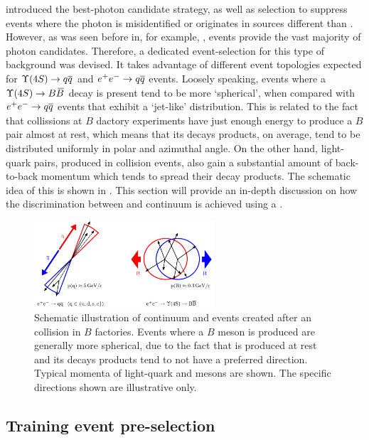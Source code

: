  introduced the best-photon candidate strategy, 
as well as selection to suppress events 
where the photon is misidentified or originates in sources different than \BtoXsgamma.
However, as was seen before in, for example, ,
\epem\ra\qqbar events provide the vast majority of photon candidates.
Therefore, a dedicated event-selection for this type of background was devised.
It takes advantage of  different event topologies expected for $\FourS\to\qqbar$ and $e^+e^-\rightarrow q\overline q$ events.
Loosely speaking, events where a $\FourS\to\BB$ decay is present tend to be more `spherical', when compared with $e^+e^-\rightarrow q\overline q$ events that exhibit a `jet-like' distribution.
This is related to the fact that \epem collissions at $B$ dactory experiments have just enough energy to produce a $B$ pair almost at rest, which means that its decays products, on average, tend to be distributed uniformly in polar and azimuthal angle.
On the other hand, light-quark pairs, produced in \epem collision events, also gain a substantial amount of back-to-back momentum which tends to spread their decay products. 
The schematic idea of this is shown in .
This section will provide an in-depth discussion on how the discrimination between \BtoXsgamma and continuum is achieved using a \BDT.

\begin{figure}[htbp!]
    \centering
    \includegraphics[width=0.6\textwidth]{figures/continuum_suppression/figure_continuum_suppression_event_shapes.pdf}
    \caption{\label{fig:continuum_schematic} Schematic illustration of continuum and \BB events created after an \epem collision in $B$ factories.
    Events where a $B$ meson is produced are generally more spherical, due to the fact that \FourS is produced at rest and its decays products tend to not have a preferred direction.
    Typical momenta of light-quark and \BB mesons are shown.
    The specific directions shown are illustrative only. 
    }
\end{figure}

\subsection{Training event pre-selection}\label{sec:preselection}

